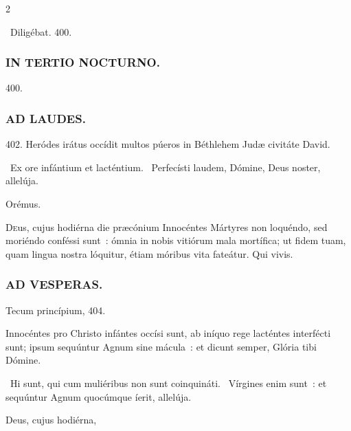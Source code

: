 \documentclass[9pt,twoside]{extarticle}
\begin{document}
\begin{multicols}{2}
\begin{tightlist}{}
\item {}~Diligébat. 400.
\end{tightlist}

\subsubsection*{\center \textsc{IN TERTIO NOCTURNO.}}
\begin{tightlist}{}
\item {} 400.
\end{tightlist}

\subsubsection*{\center \textsc{AD LAUDES.}}
\begin{tightlist}{}
\item {} 402.  Heródes irátus occídit multos púeros in Béthlehem Judæ civitáte David.
\item {}~Ex ore infántium et lacténtium. ~Perfecísti laudem, Dómine, Deus noster, allelúja.
\item Orémus. \hfill {}
\end{tightlist}
\lettrine{D}eus, cujus hodiérna die præcónium Innocéntes Mártyres non loquéndo, sed moriéndo conféssi sunt~: ómnia in nobis vitiórum mala mortífica; ut fidem tuam, quam lingua nostra lóquitur, étiam móribus vita fateátur. Qui vivis.


\subsubsection*{\center \textsc{AD VESPERAS.}}
\begin{tightlist}{}
\item {} Tecum princípium,  404.
\item {} Innocéntes pro Christo infántes occísi sunt, ab iníquo rege lacténtes interfécti sunt; ipsum sequúntur Agnum sine mácula~: et dicunt semper, Glória tibi Dómine.
\item {}~Hi sunt, qui cum muliéribus non sunt coinquináti. ~Vírgines enim sunt~: et sequúntur Agnum quocúmque íerit, allelúja.
\item {} Deus, cujus hodiérna, 
\end{tightlist}


\end{multicols}
\end{document}
